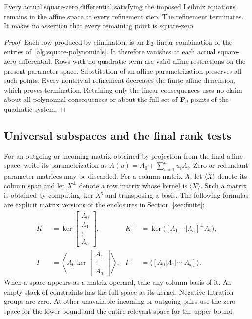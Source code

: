 \begin{lemma}\label{alg:square-soundness}
Every actual square-zero differential satisfying the imposed Leibniz
equations remains in the affine space at every refinement step.
The refinement terminates.  It makes no assertion that every remaining
point is square-zero.
\end{lemma}

\begin{proof}
Each row produced by elimination is an $\mathbf F_3$-linear combination of
the entries of~\eqref{alg:square-polynomials}.  It therefore vanishes
at each actual square-zero differential.  Rows with no quadratic term
are valid affine restrictions on the present parameter space.
Substitution of an affine parametrization preserves all such points.
Every nontrivial refinement decreases the finite affine dimension,
which proves termination.  Retaining only the linear consequences
uses no claim about all polynomial consequences or about the full set
of $\mathbf F_3$-points of the quadratic system.
\end{proof}

\subsection{Universal subspaces and the final rank tests}

For an outgoing or incoming matrix obtained by projection from the final
affine space, write its parametrization as
$A(u)=A_0+\sum_{i=1}^a u_iA_i$.  Zero or redundant parameter matrices
may be discarded.  For a column matrix $X$, let $\langle X\rangle$
denote its column span and let $X^\perp$ denote a row matrix whose
kernel is $\langle X\rangle$.  Such a matrix is obtained by computing
$\ker X^{\mathsf t}$ and transposing a basis.  The following formulas
are explicit matrix versions of the enclosures in
Section~\ref{sec:finite}:
\begin{align}
 K^-&=\ker\begin{bmatrix}A_0\\A_1\\\vdots\\A_a\end{bmatrix},
 &K^+&=\ker\bigl([A_1|\cdots|A_a]^\perp A_0\bigr),
 \label{alg:kernel-enclosures}\\
 I^-&=\left\langle A_0\ker\begin{bmatrix}A_1\\\vdots\\A_a\end{bmatrix}
                              \right\rangle,
 &I^+&=\langle[A_0|A_1|\cdots|A_a]\rangle.
 \label{alg:image-enclosures}
\end{align}
When a space appears as a matrix operand, take any column basis of it.
An empty stack of constraints has the full space as its kernel.
Negative-filtration groups are zero.  At other unavailable incoming
or outgoing pairs use the zero space for the lower bound and the
entire relevant space for the upper bound.

